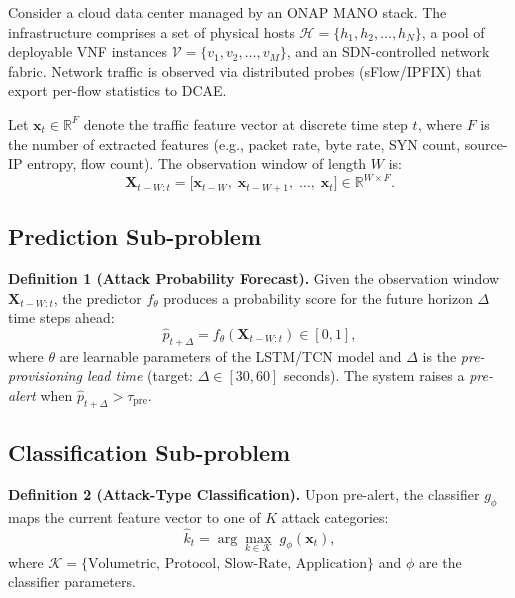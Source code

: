 \documentclass[12pt, a4paper]{article}
\begin{document}
Consider a cloud data center managed by an ONAP MANO stack. The infrastructure
comprises a set of physical hosts $\mathcal{H} = \{h_1, h_2, \ldots, h_N\}$,
a pool of deployable VNF instances $\mathcal{V} = \{v_1, v_2, \ldots, v_M\}$,
and an SDN-controlled network fabric. Network traffic is observed via
distributed probes (sFlow/IPFIX) that export per-flow statistics to DCAE.

Let $\mathbf{x}_t \in \mathbb{R}^F$ denote the traffic feature vector at
discrete time step $t$, where $F$ is the number of extracted features
(e.g., packet rate, byte rate, SYN count, source-IP entropy, flow count).
The observation window of length $W$ is:
\begin{equation}
  \mathbf{X}_{t-W:t} = \bigl[\mathbf{x}_{t-W},\; \mathbf{x}_{t-W+1},\; \ldots,\; \mathbf{x}_{t}\bigr]
  \in \mathbb{R}^{W \times F}.
  \label{eq:obs_window}
\end{equation}

\subsection{Prediction Sub-problem}

\textbf{Definition 1 (Attack Probability Forecast).}
Given the observation window $\mathbf{X}_{t-W:t}$, the predictor $f_\theta$
produces a probability score for the future horizon $\Delta$ time steps ahead:
\begin{equation}
  \hat{p}_{t+\Delta} = f_\theta\!\left(\mathbf{X}_{t-W:t}\right) \in [0, 1],
  \label{eq:predictor}
\end{equation}
where $\theta$ are learnable parameters of the LSTM/TCN model and $\Delta$
is the \textit{pre-provisioning lead time} (target: $\Delta \in [30, 60]$
seconds). The system raises a \textit{pre-alert} when
$\hat{p}_{t+\Delta} > \tau_{\mathrm{pre}}$.

\subsection{Classification Sub-problem}

\textbf{Definition 2 (Attack-Type Classification).}
Upon pre-alert, the classifier $g_\phi$ maps the current feature vector to
one of $K$ attack categories:
\begin{equation}
  \hat{k}_t = \arg\max_{k \in \mathcal{K}}\; g_\phi\!\left(\mathbf{x}_t\right),
  \label{eq:classifier}
\end{equation}
where $\mathcal{K} = \{\text{Volumetric},\, \text{Protocol},\,
\text{Slow-Rate},\, \text{Application}\}$ and $\phi$ are the classifier
parameters.
\end{document}
